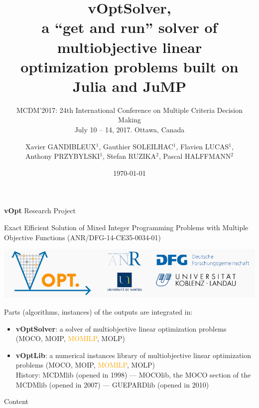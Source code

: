 \documentclass[10pt,xcolor=dvipsnames]{beamer}
\title{{{\large vOptSolver, \vspace{-0mm}\\ 
a ``get and run'' solver of multiobjective linear \vspace{-2mm}\\
 optimization problems  built on Julia and JuMP}}}
\subtitle{\scriptsize{MCDM'2017: 24th International Conference on Multiple Criteria Decision Making \vspace{-2mm}\\%
July 10 -- 14, 2017. Ottawa, Canada}}
\date{\today}
\author{Xavier GANDIBLEUX$^1$, 
Gauthier SOLEILHAC$^1$, 
Flavien    LUCAS$^1$,\\
Anthony    PRZYBYLSKI$^1$,
Stefan    RUZIKA$^2$,
Pascal    HALFFMANN$^2$}
\institute{Universit\'e de Nantes, France$^1$ -- University of Koblenz-Landau, Germany$^2$}
\newcommand{\orange}{\textcolor{orange}}
\begin{document}
\maketitle

\begin{frame}{}

\vspace{6mm}
{\Large \textbf{vOpt} Research Project}

\footnotesize{
Exact Efficient Solution of Mixed Integer Programming Problems with Multiple Objective Functions}
%
(ANR/DFG-14-CE35-0034-01)


\vspace{8mm}
  \includegraphics{logovopt5.jpg}
\vspace{8mm}



\footnotesize{
Parts (algorithms, instances) of the outputs are integrated in:
\begin{itemize}
\item \textbf{vOptSolver}: a solver of multiobjective linear optimization problems (MOCO, MOIP, \orange{MOMILP}, MOLP)
\vspace{3mm}

\item \textbf{vOptLib}: a numerical instances library of multiobjective linear optimization problems (MOCO, MOIP, \orange{MOMILP}, MOLP)\\
\smallskip
History: MCDMlib (opened in 1998) --- MOCOlib, the MOCO section of the MCDMlib (opened in 2007) --- GUEPARDlib (opened in 2010)


\end{itemize}
}

\end{frame}


\begin{frame}{Content}

\tableofcontents

\end{frame}
\end{document}
